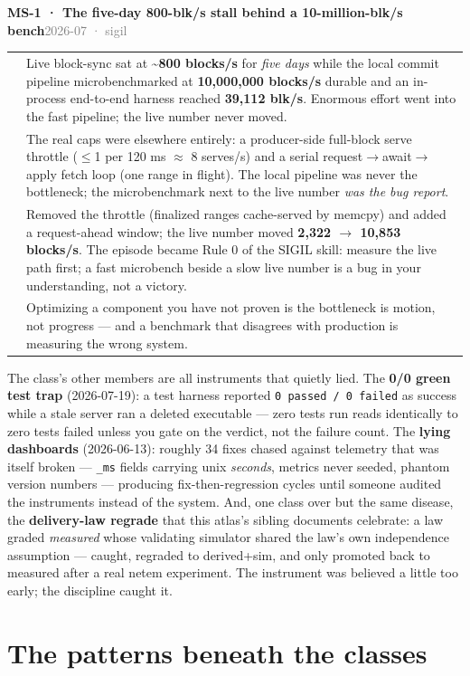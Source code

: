 \documentclass[10pt,a4paper]{article}
\makeatletter
\newcommand{\measured}[1]{\textcolor{sigilcyan}{\textbf{#1}}}
\newcommand{\svM}{{\scriptsize\textcolor{sigilamber}{\textsc{major}}}}
\newcommand{\rsFixed}{{\scriptsize\textcolor{sigilcyan}{\textsc{guarded}}}}
\newcommand{\frow}[2]{{\footnotesize\textcolor{gray}{\textsc{#1}}}\;&\small #2\\}
\newenvironment{failentry}[5]{%
\begin{tcolorbox}[enhanced,breakable,colback=white,colframe=slate,boxrule=0.6pt,arc=2pt,
  left=8pt,right=8pt,top=6pt,bottom=6pt,
  borderline west={3pt}{0pt}{sigilamber!70!slate}]
{\small\textbf{#1 · #2}\hfill{\footnotesize\textcolor{gray}{#3}}\quad#4\quad#5}\\[4pt]
\begin{tabular}{@{}>{\raggedleft\arraybackslash}p{1.8cm}p{13.2cm}@{}}
}{%
\end{tabular}
\end{tcolorbox}\vspace{2pt}}
\makeatother
\begin{document}
\begin{failentry}{MS-1}{The five-day 800-blk/s stall behind a 10-million-blk/s bench}{2026-07 · sigil}{\svM}{\rsFixed}
\frow{symptom}{Live block-sync sat at \measured{\textasciitilde800 blocks/s} for
\emph{five days} while the local commit pipeline microbenchmarked at
\measured{10{,}000{,}000 blocks/s} durable and an in-process end-to-end harness reached
\measured{39{,}112 blk/s}. Enormous effort went into the fast pipeline; the live number
never moved.}
\frow{root cause}{The real caps were elsewhere entirely: a producer-side full-block serve
throttle ($\le$1 per 120 ms $\approx$ 8 serves/s) and a serial
request$\to$await$\to$apply fetch loop (one range in flight). The local pipeline was never
the bottleneck; the microbenchmark next to the live number \emph{was the bug report}.}
\frow{guard}{Removed the throttle (finalized ranges cache-served by memcpy) and added a
request-ahead window; the live number moved \measured{2{,}322 $\to$ 10{,}853 blocks/s}.
The episode became Rule 0 of the SIGIL skill: measure the live path first; a fast
microbench beside a slow live number is a bug in your understanding, not a victory.}
\frow{lesson}{Optimizing a component you have not proven is the bottleneck is motion, not
progress — and a benchmark that disagrees with production is measuring the wrong system.}
\end{failentry}

The class's other members are all instruments that quietly lied. The \textbf{0/0 green
test trap} (2026-07-19): a test harness reported \texttt{0 passed / 0 failed} as success
while a stale server ran a deleted executable — zero tests run reads identically to zero
tests failed unless you gate on the verdict, not the failure count. The \textbf{lying
dashboards} (2026-06-13): roughly 34 fixes chased against telemetry that was itself
broken — \texttt{\_ms} fields carrying unix \emph{seconds}, metrics never seeded, phantom
version numbers — producing fix-then-regression cycles until someone audited the
instruments instead of the system. And, one class over but the same disease, the
\textbf{delivery-law regrade} that this atlas's sibling documents celebrate: a law graded
\emph{measured} whose validating simulator shared the law's own independence assumption —
caught, regraded to derived+sim, and only promoted back to measured after a real
netem experiment. The instrument was believed a little too early; the discipline caught
it.

\section{The patterns beneath the classes}\label{sec:patterns}
\end{document}

